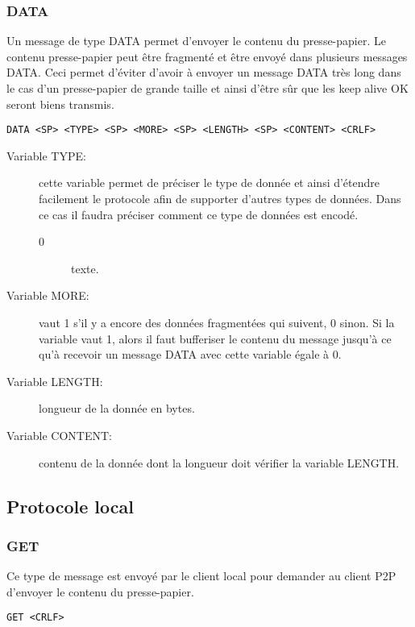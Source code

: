 \subsubsection*{DATA}
Un message de type DATA permet d'envoyer le contenu du presse-papier.
Le contenu presse-papier peut être fragmenté et être envoyé dans plusieurs
messages DATA. Ceci permet d'éviter d'avoir à envoyer un message DATA très
long dans le cas d'un presse-papier de grande taille et ainsi d'être sûr
que les keep alive OK seront biens transmis.
\begin{verbatim}
DATA <SP> <TYPE> <SP> <MORE> <SP> <LENGTH> <SP> <CONTENT> <CRLF>
\end{verbatim}
\begin{description}
\item[Variable TYPE:] cette variable permet de préciser le type
  de donnée et ainsi d'étendre facilement le protocole afin de supporter
  d'autres types de données. Dans ce cas il faudra préciser comment ce type
  de données est encodé.
  \begin{description}
  \item[0] texte.
  \end{description}
\item[Variable MORE:] vaut 1 s'il y a encore des données fragmentées qui
  suivent, 0 sinon.
  Si la variable vaut 1, alors il faut bufferiser le contenu du message
  jusqu'à ce qu'à recevoir un message DATA avec cette variable égale à 0.
\item[Variable LENGTH:] longueur de la donnée en bytes.
\item[Variable CONTENT:] contenu de la donnée dont la longueur
  doit vérifier la variable LENGTH.
\end{description}

\subsection{Protocole local}
\subsubsection*{GET}
Ce type de message est envoyé par le client local pour demander au client P2P
d'envoyer le contenu du presse-papier.
\begin{verbatim}
GET <CRLF>
\end{verbatim}

\hrulefill

